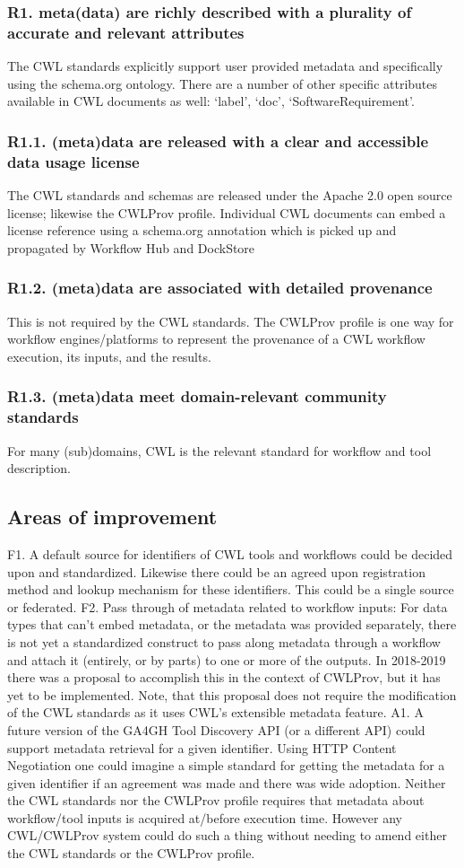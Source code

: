 \subsubsection{R1. meta(data) are richly described with a plurality of accurate and relevant attributes}
The CWL standards explicitly support user provided metadata and specifically using the schema.org ontology. There are a number of other specific attributes available in CWL documents as well: ‘label’, ‘doc’, ‘SoftwareRequirement’.
\subsubsection{R1.1. (meta)data are released with a clear and accessible data usage license}
The CWL standards and schemas are released under the Apache 2.0 open source license; likewise the CWLProv profile. Individual CWL documents can embed a license reference using a schema.org annotation which is picked up and propagated by Workflow Hub and DockStore
\subsubsection{R1.2. (meta)data are associated with detailed provenance}
This is not required by the CWL standards. The CWLProv profile is one way for workflow engines/platforms to represent the provenance of a CWL workflow execution, its inputs, and the results.
\subsubsection{R1.3. (meta)data meet domain-relevant community standards}
For many (sub)domains, CWL is the relevant standard for workflow and tool description.
\subsection{Areas of improvement}
F1. A default source for identifiers of CWL tools and workflows could be decided upon and standardized. Likewise there could be an agreed upon registration method and lookup mechanism for these identifiers. This could be a single source or federated.
F2. Pass through of metadata related to workflow inputs: For data types that can’t embed metadata, or the metadata was provided separately, there is not yet a standardized construct to pass along metadata through a workflow and attach it (entirely, or by parts) to one or more of the outputs.  In 2018-2019 there was a proposal to accomplish this in the context of CWLProv, but it has yet to be implemented. Note, that this proposal does not require the modification of the CWL standards as it uses CWL’s extensible metadata feature.
A1. A future version of the GA4GH Tool Discovery API (or a different API) could support metadata retrieval for a given identifier. Using HTTP Content Negotiation one could imagine a simple standard for getting the metadata for a given identifier if an agreement was made and there was wide adoption.
Neither the CWL standards nor the CWLProv profile requires that metadata about workflow/tool inputs is acquired at/before execution time. However any CWL/CWLProv system could do such a thing without needing to amend either the CWL standards or the CWLProv profile.
